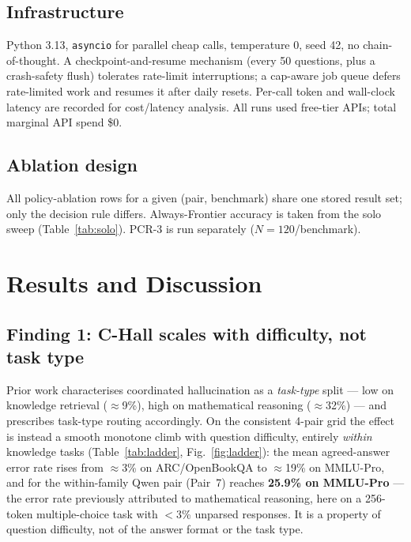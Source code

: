\documentclass[conference]{IEEEtran}
\begin{document}
\subsection{Infrastructure}
Python 3.13, \texttt{asyncio} for parallel cheap calls, temperature 0, seed 42,
no chain-of-thought. A checkpoint-and-resume mechanism (every 50 questions, plus
a crash-safety flush) tolerates rate-limit interruptions; a cap-aware job queue
defers rate-limited work and resumes it after daily resets. Per-call token and
wall-clock latency are recorded for cost/latency analysis. All runs used
free-tier APIs; total marginal API spend \$0.

\subsection{Ablation design}
All policy-ablation rows for a given (pair, benchmark) share one stored result
set; only the decision rule differs. Always-Frontier accuracy is taken from the
solo sweep (Table~\ref{tab:solo}). PCR-3 is run separately ($N=120$/benchmark).

\section{Results and Discussion}
\label{sec:results}

\subsection{Finding 1: C-Hall scales with difficulty, not task type}
Prior work characterises coordinated hallucination as a \textit{task-type} split
--- low on knowledge retrieval ($\approx$9\%), high on mathematical reasoning
($\approx$32\%) --- and prescribes task-type routing accordingly. On the
consistent 4-pair grid the effect is instead a smooth monotone climb with
question difficulty, entirely \textit{within} knowledge tasks
(Table~\ref{tab:ladder}, Fig.~\ref{fig:ladder}): the mean agreed-answer error
rate rises from $\approx$3\% on ARC/OpenBookQA to $\approx$19\% on MMLU-Pro, and
for the within-family Qwen pair (Pair~7) reaches \textbf{25.9\% on MMLU-Pro} ---
the error rate previously attributed to mathematical reasoning, here on a
256-token multiple-choice task with $<$3\% unparsed responses. It is a property
of question difficulty, not of the answer format or the task type.
\end{document}
